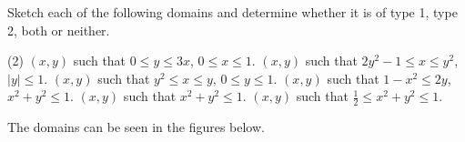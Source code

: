\begin{question}
Sketch each of the following domains and determine whether it is of type 1, type 2, both or neither.
\begin{tasks}(2)
\task
$(x,y)$ such that $0 \leq y \leq 3x$, $0 \leq x \leq 1$.
\task
$(x,y)$ such that $2y^2-1 \leq x \leq y^2$, $|y| \leq 1$.
\task
$(x,y)$ such that $y^2 \leq x \leq y$, $0 \leq y \leq 1$.
\task
$(x,y)$ such that $1 - x^2 \leq 2y$, $x^2+y^2 \leq 1$.
\task
$(x,y)$ such that $x^2 + y^2 \leq 1$.
\task
$(x,y)$ such that $\displaystyle \frac 12 \leq x^2 + y^2 \leq 1$.
\end{tasks}
\end{question}

\begin{solution}
The domains can be seen in the figures below.













\end{solution}
